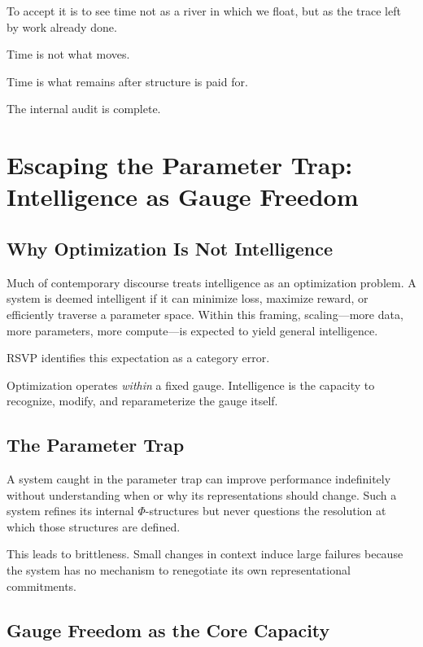 \documentclass[11pt]{book}
\begin{document}
To accept it is to see time not as a river in which we float, but as the trace left by work already done.

Time is not what moves.

Time is what remains after structure is paid for.

The internal audit is complete.


\chapter{Escaping the Parameter Trap: Intelligence as Gauge Freedom}

\section{Why Optimization Is Not Intelligence}

Much of contemporary discourse treats intelligence as an optimization problem. A system is deemed intelligent if it can minimize loss, maximize reward, or efficiently traverse a parameter space. Within this framing, scaling---more data, more parameters, more compute---is expected to yield general intelligence.

RSVP identifies this expectation as a category error.

Optimization operates \emph{within} a fixed gauge. Intelligence is the capacity to recognize, modify, and reparameterize the gauge itself.

\section{The Parameter Trap}

A system caught in the parameter trap can improve performance indefinitely without understanding when or why its representations should change. Such a system refines its internal \(\Phi\)-structures but never questions the resolution at which those structures are defined.

This leads to brittleness. Small changes in context induce large failures because the system has no mechanism to renegotiate its own representational commitments.

\section{Gauge Freedom as the Core Capacity}
\end{document}
